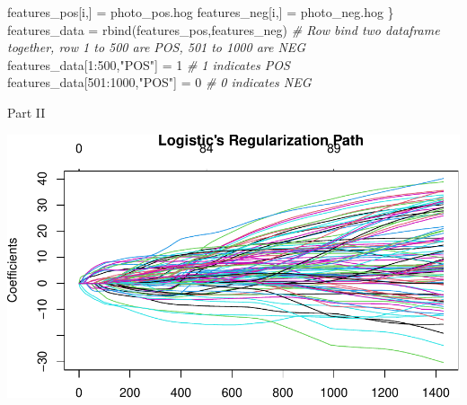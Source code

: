 \documentclass[
]{article}
\newenvironment{Shaded}{\begin{snugshade}}{\end{snugshade}}
\newcommand{\AttributeTok}[1]{\textcolor[rgb]{0.77,0.63,0.00}{#1}}
\newcommand{\CommentTok}[1]{\textcolor[rgb]{0.56,0.35,0.01}{\textit{#1}}}
\newcommand{\DecValTok}[1]{\textcolor[rgb]{0.00,0.00,0.81}{#1}}
\newcommand{\FunctionTok}[1]{\textcolor[rgb]{0.00,0.00,0.00}{#1}}
\newcommand{\NormalTok}[1]{#1}
\newcommand{\OtherTok}[1]{\textcolor[rgb]{0.56,0.35,0.01}{#1}}
\newcommand{\SpecialCharTok}[1]{\textcolor[rgb]{0.00,0.00,0.00}{#1}}
\newcommand{\StringTok}[1]{\textcolor[rgb]{0.31,0.60,0.02}{#1}}
\begin{document}
\begin{Shaded}
\begin{Highlighting}[]
\NormalTok{  features\_pos[i,] }\OtherTok{=}\NormalTok{ photo\_pos.hog}
\NormalTok{  features\_neg[i,] }\OtherTok{=}\NormalTok{ photo\_neg.hog}
\NormalTok{\}}
\NormalTok{features\_data }\OtherTok{=} \FunctionTok{rbind}\NormalTok{(features\_pos,features\_neg) }\CommentTok{\# Row bind two dataframe together, row 1 to 500 are POS, 501 to 1000 are NEG}
\NormalTok{features\_data[}\DecValTok{1}\SpecialCharTok{:}\DecValTok{500}\NormalTok{,}\StringTok{"POS"}\NormalTok{] }\OtherTok{=} \DecValTok{1} \CommentTok{\# 1 indicates POS}
\NormalTok{features\_data[}\DecValTok{501}\SpecialCharTok{:}\DecValTok{1000}\NormalTok{,}\StringTok{"POS"}\NormalTok{] }\OtherTok{=} \DecValTok{0} \CommentTok{\# 0 indicates NEG}
\end{Highlighting}
\end{Shaded}

Part II

\begin{Shaded}
\end{Shaded}

\includegraphics{HW3_Wu-Yulun_files/figure-latex/unnamed-chunk-14-1.pdf}
\end{document}
